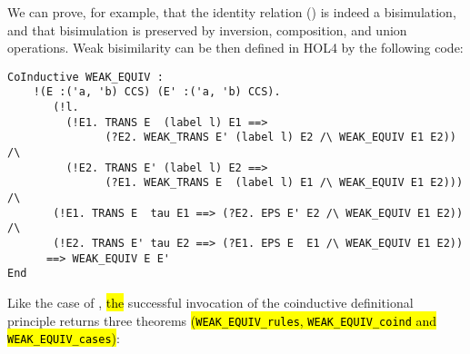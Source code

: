 We can prove, for example, that the identity relation ()
is indeed a bisimulation, and that
bisimulation is preserved by inversion, composition, and union operations.
Weak bisimilarity can be then defined in HOL4 by the following code:
\begin{lstlisting}
CoInductive WEAK_EQUIV :
    !(E :('a, 'b) CCS) (E' :('a, 'b) CCS).
       (!l.
         (!E1. TRANS E  (label l) E1 ==>
               (?E2. WEAK_TRANS E' (label l) E2 /\ WEAK_EQUIV E1 E2)) /\
         (!E2. TRANS E' (label l) E2 ==>
               (?E1. WEAK_TRANS E  (label l) E1 /\ WEAK_EQUIV E1 E2))) /\
       (!E1. TRANS E  tau E1 ==> (?E2. EPS E' E2 /\ WEAK_EQUIV E1 E2)) /\
       (!E2. TRANS E' tau E2 ==> (?E1. EPS E  E1 /\ WEAK_EQUIV E1 E2))
      ==> WEAK_EQUIV E E'
End
\end{lstlisting}
Like the case of , \hl{the} successful invocation of the
coinductive definitional principle returns three
theorems \hl{(\texttt{WEAK_EQUIV_rules}, \texttt{WEAK_EQUIV_coind} and
\texttt{WEAK_EQUIV_cases})}:
